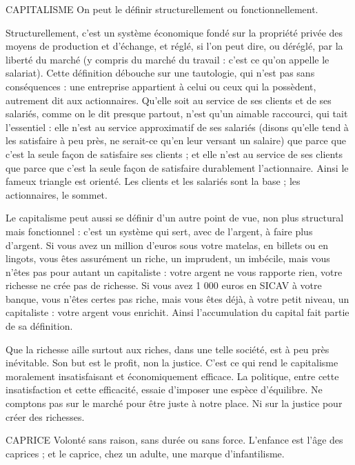 CAPITALISME On peut le définir structurellement ou fonctionnellement.

Structurellement, c’est un système économique fondé sur la
propriété privée des moyens de production et d'échange, et réglé, si l’on peut dire,
ou déréglé, par la liberté du marché (y compris du marché du travail : c’est ce qu’on
appelle le salariat). Cette définition débouche sur une tautologie, qui n’est pas sans
conséquences : une entreprise appartient à celui ou ceux qui la possèdent, autrement
dit aux actionnaires. Qu'elle soit au service de ses clients et de ses salariés,
comme on le dit presque partout, n’est qu’un aimable raccourci, qui tait l'essentiel :
elle n’est au service approximatif de ses salariés (disons qu’elle tend à les satisfaire à
peu près, ne serait-ce qu’en leur versant un salaire) que parce que c’est la seule façon
de satisfaire ses clients ; et elle n’est au service de ses clients que parce que c’est la
seule façon de satisfaire durablement l'actionnaire. Ainsi le fameux triangle est
orienté. Les clients et les salariés sont la base ; les actionnaires, le sommet.

Le capitalisme peut aussi se définir d’un autre point de vue, non plus structural
mais fonctionnel : c’est un système qui sert, avec de l'argent, à faire plus d’argent.
Si vous avez un million d’euros sous votre matelas, en billets ou en lingots, vous
êtes assurément un riche, un imprudent, un imbécile, mais vous n’êtes pas pour
autant un capitaliste : votre argent ne vous rapporte rien, votre richesse ne crée pas
de richesse. Si vous avez 1 000 euros en SICAV à votre banque, vous n'êtes certes
pas riche, mais vous êtes déjà, à votre petit niveau, un capitaliste : votre argent vous
enrichit. Ainsi l’accumulation du capital fait partie de sa définition.

Que la richesse aille surtout aux riches, dans une telle société, est à peu près
inévitable. Son but est le profit, non la justice. C’est ce qui rend le capitalisme
moralement insatisfaisant et économiquement efficace. La politique, entre cette
insatisfaction et cette efficacité, essaie d’imposer une espèce d'équilibre. Ne
comptons pas sur le marché pour être juste à notre place. Ni sur la justice pour
créer des richesses.

CAPRICE Volonté sans raison, sans durée ou sans force. L'enfance est l’âge
des caprices ; et le caprice, chez un adulte, une marque d’infantilisme.

